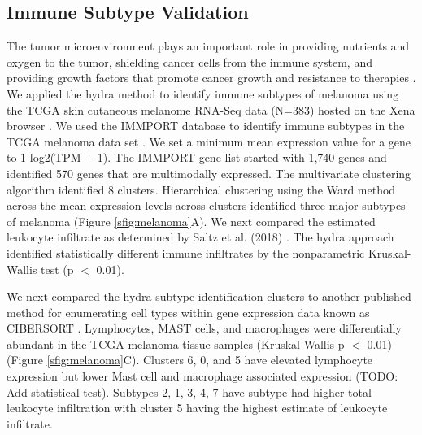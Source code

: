 \documentclass[fleqn,10pt]{wlscirep}
\begin{document}
\subsection*{Immune Subtype Validation}
The tumor microenvironment plays an important role in providing nutrients and oxygen to the tumor, shielding cancer cells from the immune system, and providing growth factors that promote cancer growth and resistance to therapies \cite{hanahan2012accessories}. We applied the hydra method to identify immune subtypes of melanoma using the TCGA skin cutaneous melanome RNA-Seq data (N=383) hosted on the Xena browser \cite{vivian2017toil}. We used the IMMPORT database to identify immune subtypes in the TCGA melanoma data set \cite{bhattacharya2018immport}. We set a minimum mean expression value for a gene to 1 log2(TPM + 1). The IMMPORT gene list started with 1,740 genes and identified 570 genes that are multimodally expressed. The multivariate clustering algorithm identified 8 clusters. Hierarchical clustering using the Ward method across the mean expression levels across clusters identified three major subtypes of melanoma (Figure \ref{sfig:melanoma}A). We next compared the estimated leukocyte infiltrate as determined by Saltz et al. (2018) \cite{saltz2018spatial}. The hydra approach identified statistically different immune infiltrates by the nonparametric Kruskal-Wallis test (p $<$ 0.01).

We next compared the hydra subtype identification clusters to another published method for enumerating cell types within gene expression data known as CIBERSORT \cite{newman2015robust}. Lymphocytes, MAST cells, and macrophages were differentially abundant in the TCGA melanoma tissue samples (Kruskal-Wallis p $<$ 0.01) (Figure \ref{sfig:melanoma}C). Clusters 6, 0, and 5 have elevated lymphocyte expression but lower Mast cell and macrophage associated expression (TODO: Add statistical test). Subtypes 2, 1, 3, 4, 7 have subtype had higher total leukocyte infiltration with cluster 5 having the highest estimate of leukocyte infiltrate.


\end{document}
